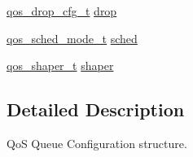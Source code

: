 \begin{DoxyCompactItemize}
\item 
\hyperlink{group__FAPI__QOS__QUEUE_ga5db7cfdc67250c1a25470eb030e4fccb}{qos\-\_\-drop\-\_\-cfg\-\_\-t} \hyperlink{structqos__queue__cfg_a6fb4600c84f6821fb50126c65f32d403}{drop}
\item 
\hyperlink{group__FAPI__QOS__QUEUE_ga1239e331f224c9a00c3047d30edaa939}{qos\-\_\-sched\-\_\-mode\-\_\-t} \hyperlink{structqos__queue__cfg_afd37a80d7d3748ec6e8b6e28adc006b4}{sched}
\item 
\hyperlink{group__FAPI__QOS__QUEUE_ga05ce7ada7ae20b289d4e675ad099c8f0}{qos\-\_\-shaper\-\_\-t} \hyperlink{structqos__queue__cfg_a7dd1ff7c97cd7199ee77f331d31a541b}{shaper}
\end{DoxyCompactItemize}


\subsection{Detailed Description}
Qo\-S Queue Configuration structure. 

